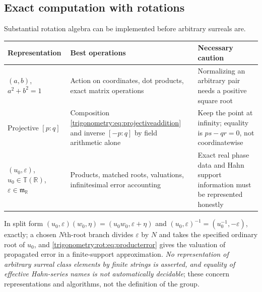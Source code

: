 \documentclass[11pt,letterpaper]{article}
\numberwithin{equation}{section}
\theoremstyle{definition}
\theoremstyle{remark}
\newcommand{\R}{\mathbb R}
\newcommand{\mm}{\mathfrak m}
\newcommand{\TT}{\mathbb T}
\newcommand{\eps}{\varepsilon}
\begin{document}
\subsection{Exact computation with rotations}\label{trigonometry:rot:sec:computation}
Substantial rotation algebra can be implemented before arbitrary surreals are.
\begin{center}\small
\begin{tabular}{L{0.21\textwidth}L{0.33\textwidth}L{0.36\textwidth}}
\toprule
Representation & Best operations & Necessary caution\\
\midrule
$(a,b)$, $a^2+b^2=1$ & Action on coordinates, dot products, exact matrix operations & Normalizing an arbitrary pair needs a positive square root\\
Projective $[p:q]$ & Composition \cref{trigonometry:eq:projectiveaddition} and inverse $[-p:q]$ by field arithmetic alone & Keep the point at infinity; equality is $ps-qr=0$, not coordinatewise\\
$(u_0,\eps)$, $u_0\in\TT(\R)$, $\eps\in\mm_{\R}$ & Products, matched roots, valuations, infinitesimal error accounting & Exact real phase data and Hahn support information must be represented honestly\\
\bottomrule
\end{tabular}
\end{center}
In split form $(u_0,\eps)(w_0,\eta)=(u_0w_0,\eps+\eta)$ and $(u_0,\eps)^{-1}=(u_0^{-1},-\eps)$, exactly;
a chosen $N$th-root branch divides $\eps$ by $N$ and takes the specified ordinary root of $u_0$, and
\cref{trigonometry:rot:eq:producterror} gives the valuation of propagated error in a finite-support
approximation. \emph{No representation of arbitrary surreal class elements by finite strings is
asserted, and equality of effective Hahn-series names is not automatically decidable}; these concern
representations and algorithms, not the definition of the group.
\end{document}
